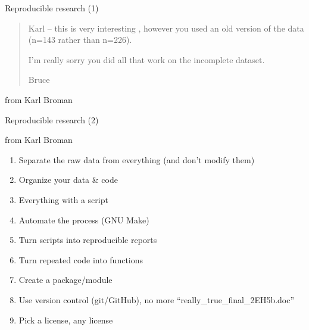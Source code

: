 \documentclass[8pt,ignorenonframetext,]{beamer}
\providecommand{\tightlist}{%
  \setlength{\itemsep}{0pt}\setlength{\parskip}{0pt}}
\begin{document}
\begin{frame}{Reproducible research (1)}

\begin{quote}
Karl -- this is very interesting , however you used an old version of
the data (n=143 rather than n=226).

I'm really sorry you did all that work on the incomplete dataset.

Bruce
\end{quote}

from Karl Broman

\end{frame}

\begin{frame}{Reproducible research (2)}

from Karl Broman

\begin{enumerate}
\def\labelenumi{\arabic{enumi}.}
\setcounter{enumi}{-1}
\tightlist
\item
  Separate the raw data from everything (and don't modify them)
\item
  Organize your data \& code
\item
  Everything with a script
\item
  Automate the process (GNU Make)
\item
  Turn scripts into reproducible reports
\item
  Turn repeated code into functions
\item
  Create a package/module
\item
  Use version control (git/GitHub), no more
  ``really\_true\_final\_2EH5b.doc''
\item
  Pick a license, any license
\end{enumerate}

\end{frame}
\end{document}
